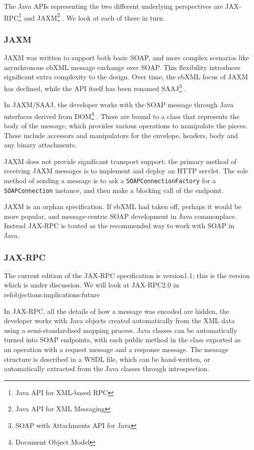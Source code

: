 The Java APIs representing the two different underlying perspectives
are JAX-RPC\footnote{Java API for XML-based RPC}
\cite{spec:JAX-RPC-11} and JAXM\footnote{Java API for XML Messaging}
\cite{spec:JAX-M-11}. We look at each of these in turn.

\subsubsection{JAXM}
\label{intro:jaxm}

JAXM was written to support both basic SOAP, and more complex
scenarios like asynchronous ebXML message exchange over SOAP. This
flexibility introduces significant extra complexity to the design.
Over time, the ebXML focus of JAXM has declined, while the API itself
has been renamed SAAJ\footnote{SOAP with Attachments API for Java}
\cite{spec:SAAJ-12}.

In JAXM/SAAJ, the developer works with the SOAP message through Java
interfaces derived from DOM\footnote{Document Object Model}
\cite{spec:DOM}. These are bound to a class that represents the body
of the message, which provides various operations to manipulate the
pieces. These include accessors and manipulators for the envelope,
headers, body and any binary attachments.

JAXM does not provide significant transport support: the primary
method of receiving JAXM messages is to implement and deploy an HTTP
servlet.  The sole method of sending a message is to ask a
{\tt SOAPConnectionFactory} for a {\tt SOAPConnection} instance, and
then make a blocking call of the endpoint.

JAXM is an orphan specification. If ebXML had taken off, perhaps it
would be more popular, and message-centric SOAP development in Java
commonplace. Instead JAX-RPC is touted as the recommended way to work
with SOAP in Java. 

\subsubsection{JAX-RPC}
\label{intro:jax-rpc}

The current edition of the JAX-RPC specification is version1.1; this
is the version which is under discussion. We will look at JAX-RPC2.0 in 
ref{objections:implications:future}

In JAX-RPC, all the details of how a message was encoded are hidden, the
developer works with Java objects created automatically from the XML data using
a semi-standardised mapping process. Java classes can be automatically turned
into SOAP endpoints, with each public method in the class exported as an
operation with a request message and a response message. The message structure
is described in a WSDL file, which can be hand-written, or automatically
extracted from the Java classes through introspection.

